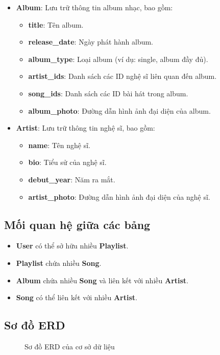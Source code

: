 \begin{itemize}
    \item \textbf{Album}: Lưu trữ thông tin album nhạc, bao gồm:
    \begin{itemize}
        \item \textbf{title}: Tên album.
        \item \textbf{release\_date}: Ngày phát hành album.
        \item \textbf{album\_type}: Loại album (ví dụ: single, album đầy đủ).
        \item \textbf{artist\_ids}: Danh sách các ID nghệ sĩ liên quan đến album.
        \item \textbf{song\_ids}: Danh sách các ID bài hát trong album.
        \item \textbf{album\_photo}: Đường dẫn hình ảnh đại diện của album.
    \end{itemize}

    \item \textbf{Artist}: Lưu trữ thông tin nghệ sĩ, bao gồm:
    \begin{itemize}
        \item \textbf{name}: Tên nghệ sĩ.
        \item \textbf{bio}: Tiểu sử của nghệ sĩ.
        \item \textbf{debut\_year}: Năm ra mắt.
        \item \textbf{artist\_photo}: Đường dẫn hình ảnh đại diện của nghệ sĩ.
    \end{itemize}
\end{itemize}

\subsection{Mối quan hệ giữa các bảng}
\begin{itemize}
    \item \textbf{User} có thể sở hữu nhiều \textbf{Playlist}.
    \item \textbf{Playlist} chứa nhiều \textbf{Song}.
    \item \textbf{Album} chứa nhiều \textbf{Song} và liên kết với nhiều \textbf{Artist}.
    \item \textbf{Song} có thể liên kết với nhiều \textbf{Artist}.
\end{itemize}

\subsection{Sơ đồ ERD}
\begin{figure}[h]
    \centering
    \caption{Sơ đồ ERD của cơ sở dữ liệu}
\end{figure}
